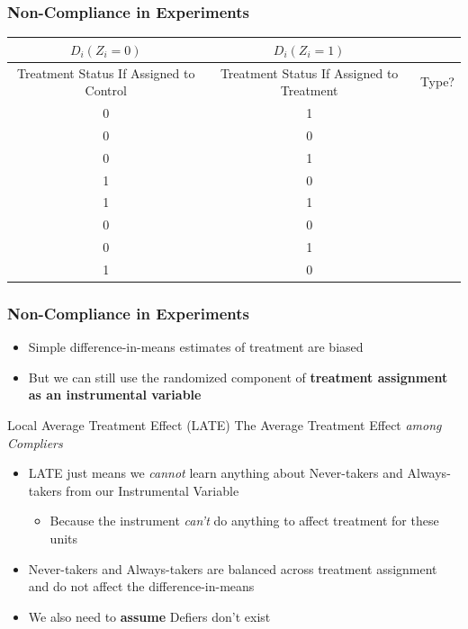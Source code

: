 \documentclass[xcolor=x11names,compress]{beamer}\usepackage[]{graphicx}\usepackage[]{color}
\renewcommand{\(}{\begin{columns}}
\renewcommand{\)}{\end{columns}}
\newcommand{\<}[1]{\begin{column}{#1}}
\renewcommand{\>}{\end{column}}
\begin{document}
\begin{frame}
\frametitle{Non-Compliance in Experiments}
\begin{table}[htbp]
  \centering
    \begin{tabular}{c|c|c}
    \multicolumn{1}{p{3cm}}{$D_i(Z_i=0)$} & \multicolumn{1}{p{3cm}}{$D_i(Z_i=1)$} & \multicolumn{1}{l}{} \\
    \hline
    \multicolumn{1}{p{3cm}|}{Treatment Status If Assigned to Control} & \multicolumn{1}{p{3cm}|}{Treatment Status If Assigned to Treatment} & \multicolumn{1}{p{3cm}}{Type?} \\
    \hline
    0     & 1     &  \\
    0     & 0     &  \\
    0     & 1     &  \\
    1     & 0     &  \\
    1     & 1     &  \\
    0     & 0     &  \\
    0     & 1     &  \\
    1     & 0     &  \\
    \end{tabular}%
  \label{tab:addlabel}%
\end{table}%

\end{frame}

\begin{frame}
\frametitle{Non-Compliance in Experiments}
\begin{itemize}
\item Simple difference-in-means estimates of treatment are biased
\pause
\item But we can still use the randomized component of \textbf{treatment assignment as an instrumental variable}
\pause
\end{itemize}
\begin{block}{Local Average Treatment Effect (LATE)}
The Average Treatment Effect \textit{among Compliers}
\end{block}
\begin{itemize}
\item LATE just means we \textit{cannot} learn anything about Never-takers and Always-takers from our Instrumental Variable
\pause
\begin{itemize}
\item Because the instrument \textit{can't} do anything to affect treatment for these units
\end{itemize}
\pause
\item Never-takers and Always-takers are balanced across treatment assignment and do not affect the difference-in-means
\pause
\item We also need to \textbf{assume} Defiers don't exist
\end{itemize}
\end{frame}
\end{document}

